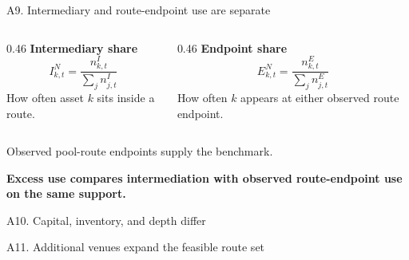 \begin{frame}{A9. Intermediary and route-endpoint use are separate}
\begin{columns}[T]
\begin{column}{0.46\textwidth}
\textbf{Intermediary share}
\[
I^N_{k,t}=\frac{n^I_{k,t}}{\sum_j n^I_{j,t}}
\]
How often asset $k$ sits inside a route.
\end{column}
\begin{column}{0.46\textwidth}
\textbf{Endpoint share}
\[
E^N_{k,t}=\frac{n^E_{k,t}}{\sum_j n^E_{j,t}}
\]
How often $k$ appears at either observed route endpoint.
\end{column}
\end{columns}
\vspace{0.16cm}
{\small Observed pool-route endpoints supply the benchmark.\par}
\vspace{0.16cm}
{\normalsize\color{ucldark}\bfseries Excess use compares intermediation with observed route-endpoint use on the same support.\par}
\end{frame}

\begin{frame}{A10. Capital, inventory, and depth differ}
\centering
\resizebox{0.965\textwidth}{!}{}\par
\end{frame}

\begin{frame}{A11. Additional venues expand the feasible route set}
\centering
\vspace{0.06cm}
\resizebox{\textwidth}{!}{}\par
\end{frame}

